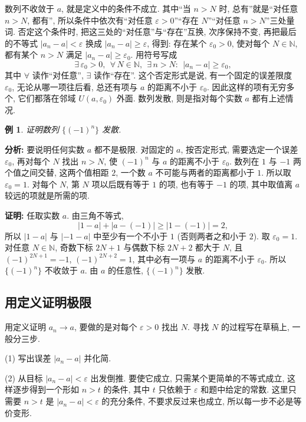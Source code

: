\documentclass[UTF8,openany]{ctexbook}
\theoremstyle{chinesetextbook}
\newtheorem{example}{例}[section]
\newenvironment{cnproof}{\par\indent\textbf{证明:} \ignorespaces}{\par}
\begin{document}
数列不收敛于 $a$, 就是定义中的条件不成立. 其中“当 $n>N$ 时, 总有”就是“对任意 $n>N$, 都有”, 所以条件中依次有“对任意 $\varepsilon>0$”“存在 $N$”“对任意 $n>N$”三处量词. 否定这个条件时, 把这三处的“对任意”与“存在”互换, 次序保持不变, 再把最后的不等式 $|a_n-a|<\varepsilon$ 换成 $|a_n-a|\ge\varepsilon$, 得到: 存在某个 $\varepsilon_0>0$, 使对每个 $N\in\mathbb N$, 都有某个 $n>N$ 满足 $|a_n-a|\ge\varepsilon_0$. 用符号写成
\[
\exists\,\varepsilon_0>0,\ \ \forall\,N\in\mathbb N,\ \ \exists\,n>N:\ \ |a_n-a|\ge\varepsilon_0,
\]
其中 $\forall$ 读作“对任意”, $\exists$ 读作“存在”. 这个否定形式是说, 有一个固定的误差限度 $\varepsilon_0$, 无论从哪一项往后看, 总还有项与 $a$ 的距离不小于 $\varepsilon_0$. 因此这样的项有无穷多个, 它们都落在邻域 $U(a,\varepsilon_0)$ 外面. 数列发散, 则是指对每个实数 $a$ 都有上述情况.
\begin{example}\label{ex:12-div}
证明数列 $\{(-1)^n\}$ 发散.
\end{example}
\par\indent\textbf{分析:} 要说明任何实数 $a$ 都不是极限. 对固定的 $a$, 按否定形式, 需要选定一个误差 $\varepsilon_0$, 再对每个 $N$ 找出 $n>N$, 使 $(-1)^n$ 与 $a$ 的距离不小于 $\varepsilon_0$. 数列在 $1$ 与 $-1$ 两个值之间交替, 这两个值相距 $2$, 一个数 $a$ 不可能与两者的距离都小于 $1$. 所以取 $\varepsilon_0=1$. 对每个 $N$, 第 $N$ 项以后既有等于 $1$ 的项, 也有等于 $-1$ 的项, 其中取值离 $a$ 较远的项就是所需的项.
\begin{cnproof}
任取实数 $a$. 由三角不等式,
\[
|1-a|+|a-(-1)|\ge|1-(-1)|=2,
\]
所以 $|1-a|$ 与 $|-1-a|$ 中至少有一个不小于 $1$ (否则两者之和小于 $2$). 取 $\varepsilon_0=1$. 对任意 $N\in\mathbb N$, 奇数下标 $2N+1$ 与偶数下标 $2N+2$ 都大于 $N$, 且 $(-1)^{2N+1}=-1$, $(-1)^{2N+2}=1$, 其中必有一项与 $a$ 的距离不小于 $\varepsilon_0$. 所以 $\{(-1)^n\}$ 不收敛于 $a$. 由 $a$ 的任意性, $\{(-1)^n\}$ 发散.
\end{cnproof}
\subsection{用定义证明极限}
用定义证明 $a_n\to a$, 要做的是对每个 $\varepsilon>0$ 找出 $N$. 寻找 $N$ 的过程写在草稿上, 一般分三步.

(1) 写出误差 $|a_n-a|$ 并化简.

(2) 从目标 $|a_n-a|<\varepsilon$ 出发倒推. 要使它成立, 只需某个更简单的不等式成立, 这样逐步得到一个形如 $n>t$ 的条件, 其中 $t$ 只依赖于 $\varepsilon$ 和题中给定的常数. 这里只需要 $n>t$ 是 $|a_n-a|<\varepsilon$ 的充分条件, 不要求反过来也成立, 所以每一步不必是等价变形.
\end{document}
